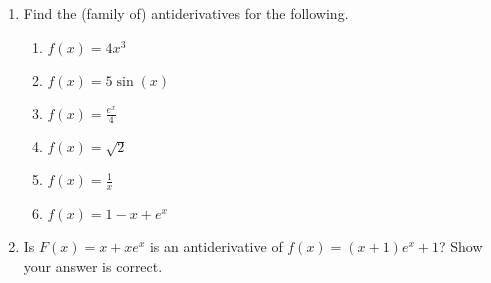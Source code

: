 \documentclass[11pt,fleqn]{article}
\begin{document}
\vspace*{-0.7in}

\begin{center}
  \Large{}
\end{center}

\begin{enumerate}
\item Find the (family of) antiderivatives for the following.
	\begin{enumerate}
	\item $f(x)=4x^3$\\
	\vfill
		
	\item $f(x)=5\sin(x)$	\\
	\vfill
	
	\item $f(x) = \frac{e^x}{4}$	\\
	\vfill
	
	\item $f(x)=\sqrt{2}$\\
	\vfill
	
	\item $f(x)=\frac{1}{x}$\\
	\vfill
	
	\item $f(x) = 1-x+e^x$\\
	\vfill
	\end{enumerate}

\item Is $F(x)=x+xe^x$ is an antiderivative of $f(x)=(x+1)e^x+1$? Show your answer is correct.\\

\vspace{2in}


\end{enumerate}
\end{document}
